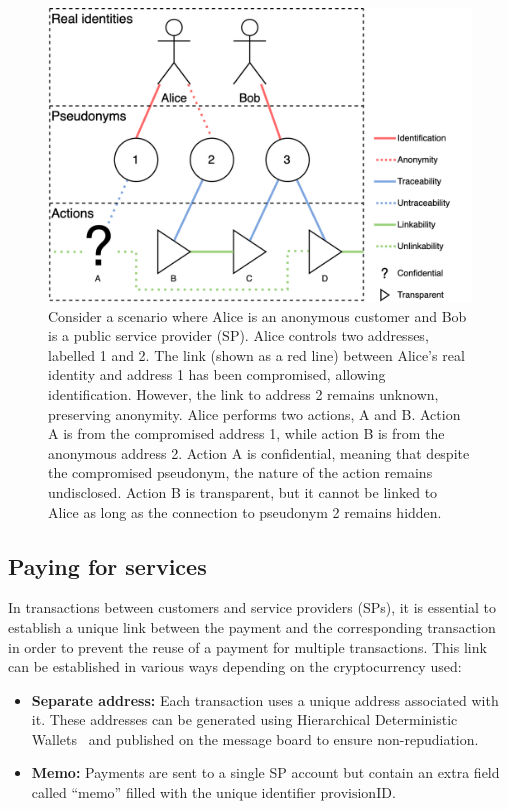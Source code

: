 \documentclass[pdftex,twocolumn,epjc3]{svjour3}
\begin{document}
\begin{figure}[h!]
\includegraphics[width=\linewidth]{anonymity-diagram.png}
\centering
\caption{Consider a scenario where Alice is an anonymous customer and Bob is a public service provider (SP). Alice controls two addresses, labelled 1 and 2. The link (shown as a red line) between Alice's real identity and address 1 has been compromised, allowing identification. However, the link to address 2 remains unknown, preserving anonymity. Alice performs two actions, A and B. Action A is from the compromised address 1, while action B is from the anonymous address 2. Action A is confidential, meaning that despite the compromised pseudonym, the nature of the action remains undisclosed. Action B is transparent, but it cannot be linked to Alice as long as the connection to pseudonym 2 remains hidden.}
\label{fig:anonymity-diagram}
\end{figure}

\subsection{Paying for services}\label{payment-for-services}

\begin{sloppypar}
In transactions between customers and service providers (SPs), it is essential to establish a unique link between the payment and the corresponding transaction in order to prevent the reuse of a payment for multiple transactions. This link can be established in various ways depending on the cryptocurrency used:
\end{sloppypar}

\begin{sloppypar}
\begin{itemize}
    \item \textbf{Separate address:} Each transaction uses a unique address associated with it. These addresses can be generated using Hierarchical Deterministic Wallets~\cite{wuilleBIP32HierarchicalDeterministic2012} and published on the message board to ensure non-repudiation.
    \item \textbf{Memo:} Payments are sent to a single SP account but contain an extra field called ``memo'' filled with the unique identifier $\textrm{provisionID}$.
\end{itemize}
\end{sloppypar}
\end{document}
